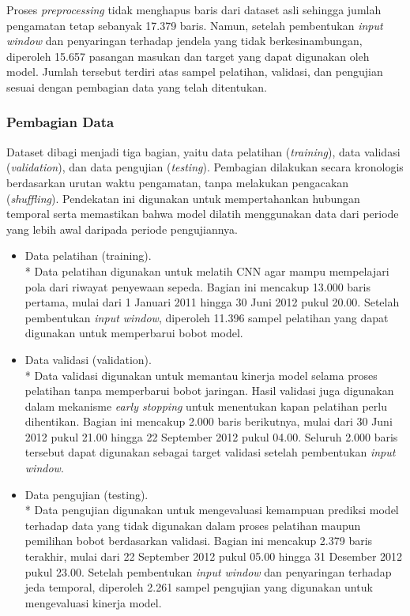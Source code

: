 \documentclass[10pt,conference]{IEEEtran}
\begin{document}
Proses \textit{preprocessing} tidak menghapus baris dari dataset asli sehingga jumlah pengamatan tetap sebanyak 17.379 baris. Namun, setelah pembentukan \textit{input window} dan penyaringan terhadap jendela yang tidak berkesinambungan, diperoleh 15.657 pasangan masukan dan target yang dapat digunakan oleh model. Jumlah tersebut terdiri atas sampel pelatihan, validasi, dan pengujian sesuai dengan pembagian data yang telah ditentukan.

\subsubsection{Pembagian Data}

Dataset dibagi menjadi tiga bagian, yaitu data pelatihan (\textit{training}), data validasi (\textit{validation}), dan data pengujian (\textit{testing}). Pembagian dilakukan secara kronologis berdasarkan urutan waktu pengamatan, tanpa melakukan pengacakan (\textit{shuffling}). Pendekatan ini digunakan untuk mempertahankan hubungan temporal serta memastikan bahwa model dilatih menggunakan data dari periode yang lebih awal daripada periode pengujiannya.

\begin{itemize}
\item Data pelatihan (training).\\*
Data pelatihan digunakan untuk melatih CNN agar mampu mempelajari pola dari riwayat penyewaan sepeda. Bagian ini mencakup 13.000 baris pertama, mulai dari 1 Januari 2011 hingga 30 Juni 2012 pukul 20.00. Setelah pembentukan \textit{input window}, diperoleh 11.396 sampel pelatihan yang dapat digunakan untuk memperbarui bobot model.

\item Data validasi (validation).\\*
Data validasi digunakan untuk memantau kinerja model selama proses pelatihan tanpa memperbarui bobot jaringan. Hasil validasi juga digunakan dalam mekanisme \textit{early stopping} untuk menentukan kapan pelatihan perlu dihentikan. Bagian ini mencakup 2.000 baris berikutnya, mulai dari 30 Juni 2012 pukul 21.00 hingga 22 September 2012 pukul 04.00. Seluruh 2.000 baris tersebut dapat digunakan sebagai target validasi setelah pembentukan \textit{input window}.

\item Data pengujian (testing).\\*
Data pengujian digunakan untuk mengevaluasi kemampuan prediksi model terhadap data yang tidak digunakan dalam proses pelatihan maupun pemilihan bobot berdasarkan validasi. Bagian ini mencakup 2.379 baris terakhir, mulai dari 22 September 2012 pukul 05.00 hingga 31 Desember 2012 pukul 23.00. Setelah pembentukan \textit{input window} dan penyaringan terhadap jeda temporal, diperoleh 2.261 sampel pengujian yang digunakan untuk mengevaluasi kinerja model.

\end{itemize}
\end{document}
